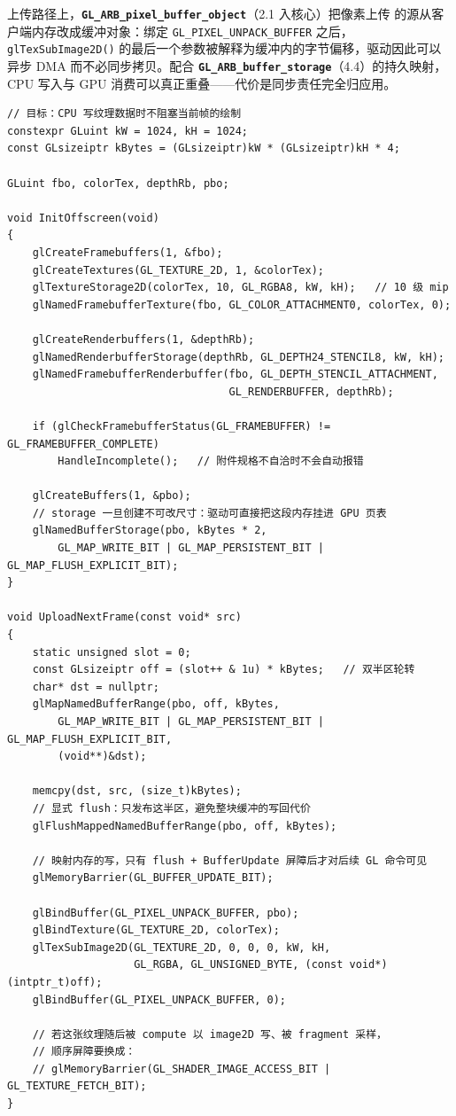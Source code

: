 \documentclass[12pt,a4paper,fontset=fandol]{ctexbook}
\newcommand{\Fn}[1]{\texttt{#1()}}
\newcommand{\Tp}[1]{\texttt{#1}}
\newcommand{\Lib}[1]{\textbf{\texttt{#1}}}
\begin{document}
上传路径上，\Lib{GL\_ARB\_pixel\_buffer\_object}（2.1 入核心）把像素上传
的源从客户端内存改成缓冲对象：绑定 \Tp{GL\_PIXEL\_UNPACK\_BUFFER} 之后，
\Fn{glTexSubImage2D} 的最后一个参数被解释为缓冲内的字节偏移，驱动因此可以
异步 DMA 而不必同步拷贝。配合 \Lib{GL\_ARB\_buffer\_storage}（4.4）的持久映射，
CPU 写入与 GPU 消费可以真正重叠------代价是同步责任完全归应用。

\begin{lstlisting}[style=cppstyle,caption={FBO 离屏目标与双半区持久映射 PBO 上传，含屏障用法},label={lst:ch11-fbo-pbo}]
// 目标：CPU 写纹理数据时不阻塞当前帧的绘制
constexpr GLuint kW = 1024, kH = 1024;
const GLsizeiptr kBytes = (GLsizeiptr)kW * (GLsizeiptr)kH * 4;

GLuint fbo, colorTex, depthRb, pbo;

void InitOffscreen(void)
{
    glCreateFramebuffers(1, &fbo);
    glCreateTextures(GL_TEXTURE_2D, 1, &colorTex);
    glTextureStorage2D(colorTex, 10, GL_RGBA8, kW, kH);   // 10 级 mip
    glNamedFramebufferTexture(fbo, GL_COLOR_ATTACHMENT0, colorTex, 0);

    glCreateRenderbuffers(1, &depthRb);
    glNamedRenderbufferStorage(depthRb, GL_DEPTH24_STENCIL8, kW, kH);
    glNamedFramebufferRenderbuffer(fbo, GL_DEPTH_STENCIL_ATTACHMENT,
                                   GL_RENDERBUFFER, depthRb);

    if (glCheckFramebufferStatus(GL_FRAMEBUFFER) != GL_FRAMEBUFFER_COMPLETE)
        HandleIncomplete();   // 附件规格不自洽时不会自动报错

    glCreateBuffers(1, &pbo);
    // storage 一旦创建不可改尺寸：驱动可直接把这段内存挂进 GPU 页表
    glNamedBufferStorage(pbo, kBytes * 2,
        GL_MAP_WRITE_BIT | GL_MAP_PERSISTENT_BIT | GL_MAP_FLUSH_EXPLICIT_BIT);
}

void UploadNextFrame(const void* src)
{
    static unsigned slot = 0;
    const GLsizeiptr off = (slot++ & 1u) * kBytes;   // 双半区轮转
    char* dst = nullptr;
    glMapNamedBufferRange(pbo, off, kBytes,
        GL_MAP_WRITE_BIT | GL_MAP_PERSISTENT_BIT | GL_MAP_FLUSH_EXPLICIT_BIT,
        (void**)&dst);

    memcpy(dst, src, (size_t)kBytes);
    // 显式 flush：只发布这半区，避免整块缓冲的写回代价
    glFlushMappedNamedBufferRange(pbo, off, kBytes);

    // 映射内存的写，只有 flush + BufferUpdate 屏障后才对后续 GL 命令可见
    glMemoryBarrier(GL_BUFFER_UPDATE_BIT);

    glBindBuffer(GL_PIXEL_UNPACK_BUFFER, pbo);
    glBindTexture(GL_TEXTURE_2D, colorTex);
    glTexSubImage2D(GL_TEXTURE_2D, 0, 0, 0, kW, kH,
                    GL_RGBA, GL_UNSIGNED_BYTE, (const void*)(intptr_t)off);
    glBindBuffer(GL_PIXEL_UNPACK_BUFFER, 0);

    // 若这张纹理随后被 compute 以 image2D 写、被 fragment 采样，
    // 顺序屏障要换成：
    // glMemoryBarrier(GL_SHADER_IMAGE_ACCESS_BIT | GL_TEXTURE_FETCH_BIT);
}
\end{lstlisting}
\end{document}
